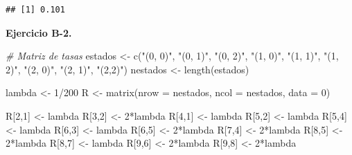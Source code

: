 \documentclass[
]{book}
\newenvironment{Shaded}{\begin{snugshade}}{\end{snugshade}}
\newcommand{\AttributeTok}[1]{\textcolor[rgb]{0.77,0.63,0.00}{#1}}
\newcommand{\CommentTok}[1]{\textcolor[rgb]{0.56,0.35,0.01}{\textit{#1}}}
\newcommand{\DecValTok}[1]{\textcolor[rgb]{0.00,0.00,0.81}{#1}}
\newcommand{\FunctionTok}[1]{\textcolor[rgb]{0.00,0.00,0.00}{#1}}
\newcommand{\NormalTok}[1]{#1}
\newcommand{\OtherTok}[1]{\textcolor[rgb]{0.56,0.35,0.01}{#1}}
\newcommand{\SpecialCharTok}[1]{\textcolor[rgb]{0.00,0.00,0.00}{#1}}
\newcommand{\StringTok}[1]{\textcolor[rgb]{0.31,0.60,0.02}{#1}}
\theoremstyle{definition}
\theoremstyle{definition}
\theoremstyle{definition}
\theoremstyle{definition}
\theoremstyle{remark}
\begin{document}
\begin{verbatim}
## [1] 0.101
\end{verbatim}

\textbf{Ejercicio B-2.}

\begin{Shaded}
\begin{Highlighting}[]
\CommentTok{\# Matriz de tasas}
\NormalTok{estados }\OtherTok{\textless{}{-}} \FunctionTok{c}\NormalTok{(}\StringTok{"(0, 0)"}\NormalTok{, }\StringTok{"(0, 1)"}\NormalTok{, }\StringTok{"(0, 2)"}\NormalTok{, }\StringTok{"(1, 0)"}\NormalTok{, }
             \StringTok{"(1, 1)"}\NormalTok{, }\StringTok{"(1, 2)"}\NormalTok{, }\StringTok{"(2, 0)"}\NormalTok{, }\StringTok{"(2, 1)"}\NormalTok{, }\StringTok{"(2,2)"}\NormalTok{)}
\NormalTok{nestados }\OtherTok{\textless{}{-}} \FunctionTok{length}\NormalTok{(estados)}

\NormalTok{lambda }\OtherTok{\textless{}{-}} \DecValTok{1}\SpecialCharTok{/}\DecValTok{200}
\NormalTok{R }\OtherTok{\textless{}{-}} \FunctionTok{matrix}\NormalTok{(}\AttributeTok{nrow =}\NormalTok{ nestados, }\AttributeTok{ncol =}\NormalTok{ nestados, }\AttributeTok{data =} \DecValTok{0}\NormalTok{)}

\NormalTok{R[}\DecValTok{2}\NormalTok{,}\DecValTok{1}\NormalTok{] }\OtherTok{\textless{}{-}}\NormalTok{ lambda }
\NormalTok{R[}\DecValTok{3}\NormalTok{,}\DecValTok{2}\NormalTok{] }\OtherTok{\textless{}{-}} \DecValTok{2}\SpecialCharTok{*}\NormalTok{lambda }
\NormalTok{R[}\DecValTok{4}\NormalTok{,}\DecValTok{1}\NormalTok{] }\OtherTok{\textless{}{-}}\NormalTok{ lambda }
\NormalTok{R[}\DecValTok{5}\NormalTok{,}\DecValTok{2}\NormalTok{] }\OtherTok{\textless{}{-}}\NormalTok{ lambda }
\NormalTok{R[}\DecValTok{5}\NormalTok{,}\DecValTok{4}\NormalTok{] }\OtherTok{\textless{}{-}}\NormalTok{ lambda }
\NormalTok{R[}\DecValTok{6}\NormalTok{,}\DecValTok{3}\NormalTok{] }\OtherTok{\textless{}{-}}\NormalTok{ lambda }
\NormalTok{R[}\DecValTok{6}\NormalTok{,}\DecValTok{5}\NormalTok{] }\OtherTok{\textless{}{-}} \DecValTok{2}\SpecialCharTok{*}\NormalTok{lambda}
\NormalTok{R[}\DecValTok{7}\NormalTok{,}\DecValTok{4}\NormalTok{] }\OtherTok{\textless{}{-}} \DecValTok{2}\SpecialCharTok{*}\NormalTok{lambda}
\NormalTok{R[}\DecValTok{8}\NormalTok{,}\DecValTok{5}\NormalTok{] }\OtherTok{\textless{}{-}} \DecValTok{2}\SpecialCharTok{*}\NormalTok{lambda}
\NormalTok{R[}\DecValTok{8}\NormalTok{,}\DecValTok{7}\NormalTok{] }\OtherTok{\textless{}{-}}\NormalTok{ lambda}
\NormalTok{R[}\DecValTok{9}\NormalTok{,}\DecValTok{6}\NormalTok{] }\OtherTok{\textless{}{-}} \DecValTok{2}\SpecialCharTok{*}\NormalTok{lambda}
\NormalTok{R[}\DecValTok{9}\NormalTok{,}\DecValTok{8}\NormalTok{] }\OtherTok{\textless{}{-}} \DecValTok{2}\SpecialCharTok{*}\NormalTok{lambda}
\end{Highlighting}
\end{Shaded}
\end{document}

